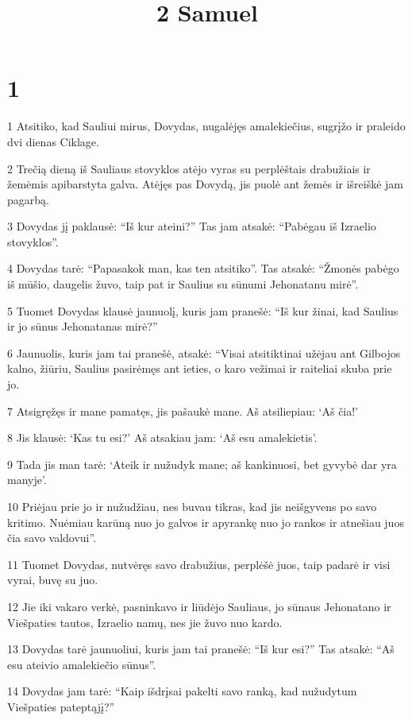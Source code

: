 

\title{
\par 2 Samuel}

\chapter{1}


\par 1 Atsitiko, kad Sauliui mirus, Dovydas, nugalėjęs amalekiečius, sugrįžo ir praleido dvi dienas Ciklage. 
\par 2 Trečią dieną iš Sauliaus stovyklos atėjo vyras su perplėštais drabužiais ir žemėmis apibarstyta galva. Atėjęs pas Dovydą, jis puolė ant žemės ir išreiškė jam pagarbą. 
\par 3 Dovydas jį paklausė: “Iš kur ateini?” Tas jam atsakė: “Pabėgau iš Izraelio stovyklos”. 
\par 4 Dovydas tarė: “Papasakok man, kas ten atsitiko”. Tas atsakė: “Žmonės pabėgo iš mūšio, daugelis žuvo, taip pat ir Saulius su sūnumi Jehonatanu mirė”. 
\par 5 Tuomet Dovydas klausė jaunuolį, kuris jam pranešė: “Iš kur žinai, kad Saulius ir jo sūnus Jehonatanas mirė?” 
\par 6 Jaunuolis, kuris jam tai pranešė, atsakė: “Visai atsitiktinai užėjau ant Gilbojos kalno, žiūriu, Saulius pasirėmęs ant ieties, o karo vežimai ir raiteliai skuba prie jo. 
\par 7 Atsigręžęs ir mane pamatęs, jis pašaukė mane. Aš atsiliepiau: ‘Aš čia!’ 
\par 8 Jis klausė: ‘Kas tu esi?’ Aš atsakiau jam: ‘Aš esu amalekietis’. 
\par 9 Tada jis man tarė: ‘Ateik ir nužudyk mane; aš kankinuosi, bet gyvybė dar yra manyje’. 
\par 10 Priėjau prie jo ir nužudžiau, nes buvau tikras, kad jis neišgyvens po savo kritimo. Nuėmiau karūną nuo jo galvos ir apyrankę nuo jo rankos ir atnešiau juos čia savo valdovui”. 
\par 11 Tuomet Dovydas, nutvėręs savo drabužius, perplėšė juos, taip padarė ir visi vyrai, buvę su juo. 
\par 12 Jie iki vakaro verkė, pasninkavo ir liūdėjo Sauliaus, jo sūnaus Jehonatano ir Viešpaties tautos, Izraelio namų, nes jie žuvo nuo kardo. 
\par 13 Dovydas tarė jaunuoliui, kuris jam tai pranešė: “Iš kur esi?” Tas atsakė: “Aš esu ateivio amalekiečio sūnus”. 
\par 14 Dovydas jam tarė: “Kaip išdrįsai pakelti savo ranką, kad nužudytum Viešpaties pateptąjį?” 
